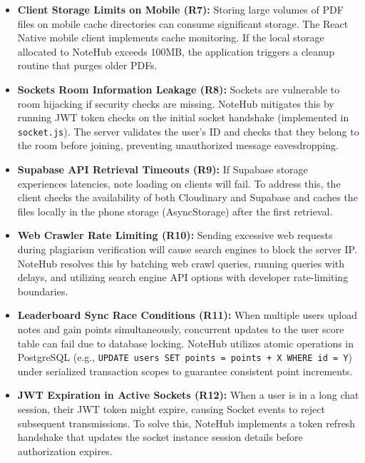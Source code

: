 \documentclass[12,Times new Roman,a4paper]{report}
\begin{document}
\begin{itemize}
    \item \textbf{Client Storage Limits on Mobile (R7):} Storing large volumes of PDF files on mobile cache directories can consume significant storage. The React Native mobile client implements cache monitoring. If the local storage allocated to NoteHub exceeds 100MB, the application triggers a cleanup routine that purges older PDFs.
    
    \item \textbf{Sockets Room Information Leakage (R8):} Sockets are vulnerable to room hijacking if security checks are missing. NoteHub mitigates this by running JWT token checks on the initial socket handshake (implemented in \texttt{socket.js}). The server validates the user's ID and checks that they belong to the room before joining, preventing unauthorized message eavesdropping.
    
    \item \textbf{Supabase API Retrieval Timeouts (R9):} If Supabase storage experiences latencies, note loading on clients will fail. To address this, the client checks the availability of both Cloudinary and Supabase and caches the files locally in the phone storage (AsyncStorage) after the first retrieval.
    
    \item \textbf{Web Crawler Rate Limiting (R10):} Sending excessive web requests during plagiarism verification will cause search engines to block the server IP. NoteHub resolves this by batching web crawl queries, running queries with delays, and utilizing search engine API options with developer rate-limiting boundaries.
    
    \item \textbf{Leaderboard Sync Race Conditions (R11):} When multiple users upload notes and gain points simultaneously, concurrent updates to the user score table can fail due to database locking. NoteHub utilizes atomic operations in PostgreSQL (e.g., \texttt{UPDATE users SET points = points + X WHERE id = Y}) under serialized transaction scopes to guarantee consistent point increments.
    
    \item \textbf{JWT Expiration in Active Sockets (R12):} When a user is in a long chat session, their JWT token might expire, causing Socket events to reject subsequent transmissions. To solve this, NoteHub implements a token refresh handshake that updates the socket instance session details before authorization expires.
\end{itemize}
\end{document}
